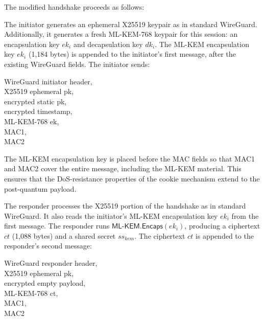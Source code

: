 The modified handshake proceeds as follows:

\begin{description}[style=nextline, leftmargin=0pt]
    \item[Initiator Actions (First Message)]
    The initiator generates an ephemeral X25519 keypair as in standard WireGuard. Additionally, it generates a fresh ML-KEM-768 keypair for this session: an encapsulation key $\mathit{ek}_i$ and decapsulation key $\mathit{dk}_i$. The ML-KEM encapsulation key $\mathit{ek}_i$ (1,184 bytes) is appended to the initiator's first message, after the existing WireGuard fields. The initiator sends:
    
    \bigskip
    \begin{center}
        WireGuard initiator header, \\
        X25519 ephemeral pk, \\
        encrypted static pk, \\
        encrypted timestamp, \\
        ML-KEM-768 ek, \\
        MAC1, \\
        MAC2
    \end{center}
    \bigskip

    The ML-KEM encapsulation key is placed before the MAC fields so that MAC1 and MAC2 cover the entire message, including the ML-KEM material. This ensures that the DoS-resistance properties of the cookie mechanism extend to the post-quantum payload.

    \item[Responder Actions (Second Message)]
    The responder processes the X25519 portion of the handshake as in standard WireGuard. It also reads the initiator's ML-KEM encapsulation key $\mathit{ek}_i$ from the first message. The responder runs $\mathsf{ML\text{-}KEM.Encaps}(\mathit{ek}_i)$, producing a ciphertext $\mathit{ct}$ (1,088 bytes) and a shared secret $\mathit{ss}_\mathit{kem}$. The ciphertext $\mathit{ct}$ is appended to the responder's second message:

    \bigskip
    \begin{center}
        WireGuard responder header, \\
        X25519 ephemeral pk, \\
        encrypted empty payload, \\
        ML-KEM-768 ct, \\
        MAC1, \\
        MAC2
    \end{center}
    \bigskip


\end{description}
